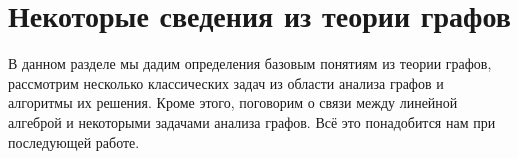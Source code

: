 \setchapterpreamble[u]{\margintoc}
\chapter{Некоторые сведения из теории графов}
\label{chpt:GraphTheoryIntro}

В данном разделе мы дадим определения базовым понятиям из теории графов, рассмотрим несколько классических задач из области анализа графов и алгоритмы их решения.
Кроме этого, поговорим о связи между линейной алгеброй и некоторыми задачами анализа графов.
Всё это понадобится нам при последующей работе.






